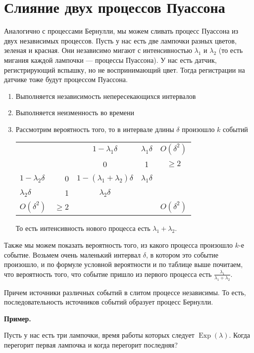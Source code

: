 \documentclass[12pt]{article}
\DeclareMathOperator{\Exp}{Exp}
\begin{document}
\section{Слияние двух процессов Пуассона}
Аналогично с процессами Бернулли, мы можем сливать процесс Пуассона из двух независимых процессов. Пусть у нас есть две лампочки разных цветов, зеленая и красная. Они независимо мигают с интенсивностью $\lambda_1$ и $\lambda_2$ (то есть мигания каждой лампочки --- процессы Пуассона). У нас есть датчик, регистрирующий вспышку, но не воспринимающий цвет. Тогда регистрации на датчике тоже будут процессом Пуассона.
\begin{enumerate}
  \item Выполняется независимость непересекающихся интервалов
  \item Выполняется неизменность во времени
  \item Рассмотрим вероятность того, то в интервале длины $\delta$ произошло $k$ событий
  \begin{center}
    \begin{tabular}{lr|ccc}
      & & $1 - \lambda_1 \delta$ & $\lambda_1\delta$ & $O(\delta^2)$ \\
      & & 0 & 1 & $\ge 2$ \\ \hline
      $1 - \lambda_2 \delta$ & 0  & $1 - (\lambda_1 + \lambda_2) \delta$ & $\lambda_1\delta$ & \\
      $\lambda_2 \delta$ & 1      & $\lambda_2\delta$ & & \\
      $O(\delta^2)$ & $\ge 2$     & & & $O(\delta^2)$ \\
    \end{tabular}
  \end{center}
  То есть интенсивность нового процесса есть $\lambda_1 + \lambda_2$.
\end{enumerate}

Также мы можем показать вероятность того, из какого процесса произошло $k$-е событие. Возьмем очень маленький интервал $\delta$, в котором это событие произошло, и по формуле условной вероятности и по таблице выше почитаем, что вероятность того, что событие пришло из первого процесса есть $\frac{\lambda_1}{\lambda_1 + \lambda_2}$.

Причем источники различных событий в слитом процессе независимы. То есть, последовательность источников событий образует процесс Бернулли.

\textbf{Пример.}

Пусть у нас есть три лампочки, время работы которых следует $\Exp(\lambda)$. Когда перегорит первая лампочка и когда перегорит последняя?
\end{document}
